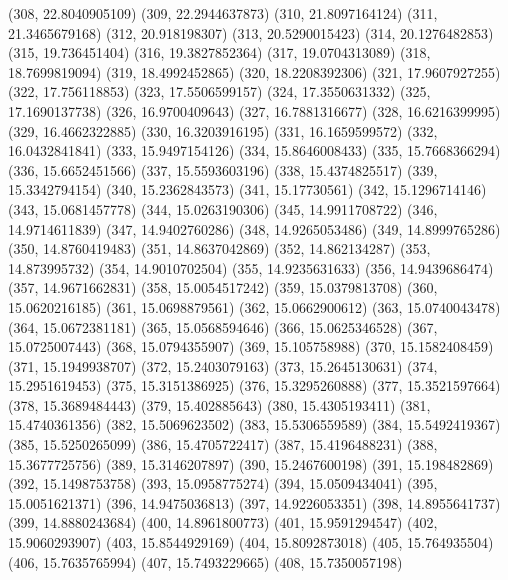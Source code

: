 {					(308, 22.8040905109)
					(309, 22.2944637873)
					(310, 21.8097164124)
					(311, 21.3465679168)
					(312, 20.918198307)
					(313, 20.5290015423)
					(314, 20.1276482853)
					(315, 19.736451404)
					(316, 19.3827852364)
					(317, 19.0704313089)
					(318, 18.7699819094)
					(319, 18.4992452865)
					(320, 18.2208392306)
					(321, 17.9607927255)
					(322, 17.756118853)
					(323, 17.5506599157)
					(324, 17.3550631332)
					(325, 17.1690137738)
					(326, 16.9700409643)
					(327, 16.7881316677)
					(328, 16.6216399995)
					(329, 16.4662322885)
					(330, 16.3203916195)
					(331, 16.1659599572)
					(332, 16.0432841841)
					(333, 15.9497154126)
					(334, 15.8646008433)
					(335, 15.7668366294)
					(336, 15.6652451566)
					(337, 15.5593603196)
					(338, 15.4374825517)
					(339, 15.3342794154)
					(340, 15.2362843573)
					(341, 15.17730561)
					(342, 15.1296714146)
					(343, 15.0681457778)
					(344, 15.0263190306)
					(345, 14.9911708722)
					(346, 14.9714611839)
					(347, 14.9402760286)
					(348, 14.9265053486)
					(349, 14.8999765286)
					(350, 14.8760419483)
					(351, 14.8637042869)
					(352, 14.862134287)
					(353, 14.873995732)
					(354, 14.9010702504)
					(355, 14.9235631633)
					(356, 14.9439686474)
					(357, 14.9671662831)
					(358, 15.0054517242)
					(359, 15.0379813708)
					(360, 15.0620216185)
					(361, 15.0698879561)
					(362, 15.0662900612)
					(363, 15.0740043478)
					(364, 15.0672381181)
					(365, 15.0568594646)
					(366, 15.0625346528)
					(367, 15.0725007443)
					(368, 15.0794355907)
					(369, 15.105758988)
					(370, 15.1582408459)
					(371, 15.1949938707)
					(372, 15.2403079163)
					(373, 15.2645130631)
					(374, 15.2951619453)
					(375, 15.3151386925)
					(376, 15.3295260888)
					(377, 15.3521597664)
					(378, 15.3689484443)
					(379, 15.402885643)
					(380, 15.4305193411)
					(381, 15.4740361356)
					(382, 15.5069623502)
					(383, 15.5306559589)
					(384, 15.5492419367)
					(385, 15.5250265099)
					(386, 15.4705722417)
					(387, 15.4196488231)
					(388, 15.3677725756)
					(389, 15.3146207897)
					(390, 15.2467600198)
					(391, 15.198482869)
					(392, 15.1498753758)
					(393, 15.0958775274)
					(394, 15.0509434041)
					(395, 15.0051621371)
					(396, 14.9475036813)
					(397, 14.9226053351)
					(398, 14.8955641737)
					(399, 14.8880243684)
					(400, 14.8961800773)
					(401, 15.9591294547)
					(402, 15.9060293907)
					(403, 15.8544929169)
					(404, 15.8092873018)
					(405, 15.764935504)
					(406, 15.7635765994)
					(407, 15.7493229665)
					(408, 15.7350057198)
}
